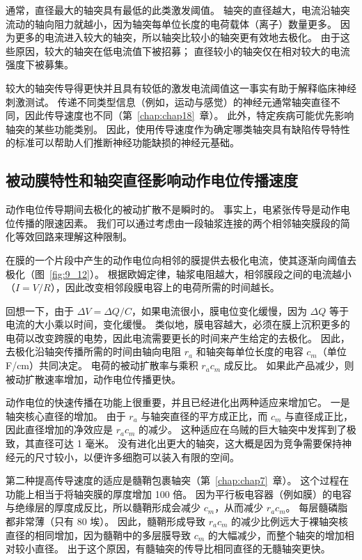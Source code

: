 通常，直径最大的轴突具有最低的此类激发阈值。
轴突的直径越大，电流沿轴突流动的轴向阻力就越小，因为轴突每单位长度的电荷载体（离子）数量更多。
因为更多的电流进入较大的轴突，所以轴突比较小的轴突更有效地去极化。
由于这些原因，较大的轴突在低电流值下被招募；
直径较小的轴突仅在相对较大的电流强度下被募集。


较大的轴突传导得更快并且具有较低的激发电流阈值这一事实有助于解释临床神经刺激测试。
传递不同类型信息（例如，运动与感觉）的神经元通常轴突直径不同，因此传导速度也不同（第~\ref{chap:chap18}~章）。
此外，特定疾病可能优先影响轴突的某些功能类别。
因此，使用传导速度作为确定哪类轴突具有缺陷传导特性的标准可以帮助人们推断神经功能缺损的神经元基础。



\subsection{被动膜特性和轴突直径影响动作电位传播速度}

动作电位传导期间去极化的被动扩散不是瞬时的。
事实上，电紧张传导是动作电位传播的限速因素。
我们可以通过考虑由一段轴浆连接的两个相邻轴突膜段的简化等效回路来理解这种限制。


在膜的一个片段中产生的动作电位向相邻的膜提供去极化电流，使其逐渐向阈值去极化（图~\ref{fig:9_12}）。 
根据欧姆定律，轴浆电阻越大，相邻膜段之间的电流越小（$I = V / R$），因此改变相邻段膜电容上的电荷所需的时间越长。


回想一下，由于 $\Delta V = \Delta Q / C$，如果电流很小，膜电位变化缓慢，因为 $\Delta Q$ 等于电流的大小乘以时间，变化缓慢。
类似地，膜电容越大，必须在膜上沉积更多的电荷以改变跨膜的电势，因此电流需要更长的时间来产生给定的去极化。
因此，去极化沿轴突传播所需的时间由轴向电阻 $r_a$ 和轴突每单位长度的电容 $c_m$（单位 F/cm）共同决定。
电荷的被动扩散率与乘积 $r_a c_m$ 成反比。
如果此产品减少，则被动扩散速率增加，动作电位传播更快。


动作电位的快速传播在功能上很重要，并且已经进化出两种适应来增加它。
一是轴突核心直径的增加。
由于 $r_a$ 与轴突直径的平方成正比，而 $c_m$ 与直径成正比，因此直径增加的净效应是 $r_a c_m$ 的减少。
这种适应在乌贼的巨大轴突中发挥到了极致，其直径可达 1 毫米。
没有进化出更大的轴突，这大概是因为竞争需要保持神经元的尺寸较小，以便许多细胞可以装入有限的空间。


第二种提高传导速度的适应是髓鞘包裹轴突（第~\ref{chap:chap7}~章）。
这个过程在功能上相当于将轴突膜的厚度增加 100 倍。
因为平行板电容器（例如膜）的电容与绝缘层的厚度成反比，所以髓鞘形成会减少 $c_m$，从而减少 $r_a c_m$。
每层髓磷脂都非常薄（只有 80 埃）。
因此，髓鞘形成导致 $r_a c_m$ 的减少比例远大于裸轴突核直径的相同增加，因为髓鞘中的多层膜导致 $c_m$ 的大幅减少，而整个轴突的增加相对较小直径。
出于这个原因，有髓轴突的传导比相同直径的无髓轴突更快。


